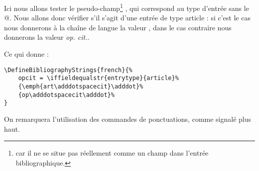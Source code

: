 Ici nous allons tester le pseudo-champ\footnote{ car il ne se situe pas réellement comme un champ dans l'entrée bibliographique.} , qui correspond au type d'entrée sans le @. Nous allons donc vérifier s'il s'agit d'une entrée de type article : si c'est le cas nous donnerons à la chaîne de langue la valeur  ,  dans le cas contraire nous donnerons la valeur \emph{op. cit.}.

Ce qui donne : 

\begin{verbatim}
\DefineBibliographyStrings{french}{%
	opcit = \iffieldequalstr{entrytype}{article}%
	{\emph{art\adddotspacecit}\adddot}%
	{op\adddotspacecit\adddot}%
}
\end{verbatim}

On remarquera l'utilisation des commandes de ponctuations, comme signalé plus haut.


	
